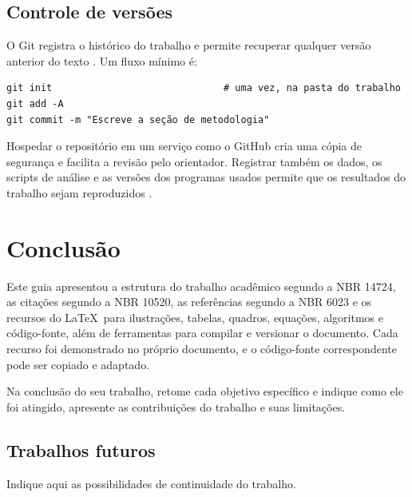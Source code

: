 \documentclass[
	12pt, %
	openright, %
	oneside, %
	a4paper, %
	sumario=tradicional, %
	english, %
	brazil, %
]{abntex2}
\begin{document}
\section{Controle de versões}\label{sec:git}

O Git registra o histórico do trabalho e permite recuperar qualquer versão anterior do texto \cite{chacon2014}. Um fluxo mínimo é:

\begin{verbatim}
git init                              # uma vez, na pasta do trabalho
git add -A
git commit -m "Escreve a seção de metodologia"
\end{verbatim}

Hospedar o repositório em um serviço como o GitHub cria uma cópia de segurança e facilita a revisão pelo orientador. Registrar também os dados, os scripts de análise e as versões dos programas usados permite que os resultados do trabalho sejam reproduzidos \cite{sandve2013}.
\chapter{Conclusão}\label{cap:conclusao}

Este guia apresentou a estrutura do trabalho acadêmico segundo a NBR 14724, as citações segundo a NBR 10520, as referências segundo a NBR 6023 e os recursos do \LaTeX\ para ilustrações, tabelas, quadros, equações, algoritmos e código-fonte, além de ferramentas para compilar e versionar o documento. Cada recurso foi demonstrado no próprio documento, e o código-fonte correspondente pode ser copiado e adaptado.

Na conclusão do seu trabalho, retome cada objetivo específico e indique como ele foi atingido, apresente as contribuições do trabalho e suas limitações.

\section{Trabalhos futuros}\label{sec:trabalhos-futuros}

Indique aqui as possibilidades de continuidade do trabalho.


\postextual
\end{document}
